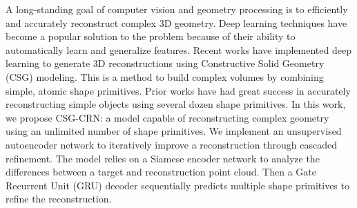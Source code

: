 
A long-standing goal of computer vision and geometry processing is to efficiently and accurately reconstruct complex 3D geometry. Deep learning techniques have become a popular solution to the problem because of their ability to automatically learn and generalize features. Recent works have implemented deep learning to generate 3D reconstructions using Constructive Solid Geometry (CSG) modeling. This is a method to build complex volumes by combining simple, atomic shape primitives. Prior works have had great success in accurately reconstructing simple objects using several dozen shape primitives. In this work, we propose CSG-CRN: a model capable of reconstructing complex geometry using an unlimited number of shape primitives. We implement an unsupervised autoencoder network to iteratively improve a reconstruction through cascaded refinement. The model relies on a Siamese encoder network to analyze the differences between a target and reconstruction point cloud. Then a Gate Recurrent Unit (GRU) decoder sequentially predicts multiple shape primitives to refine the reconstruction.

\vspace{2em}

